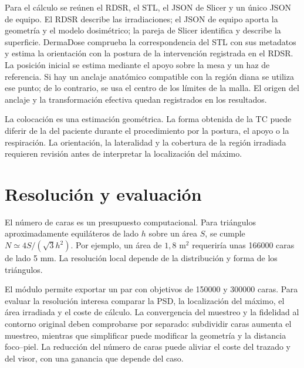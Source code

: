 Para el cálculo se reúnen el RDSR, el STL, el JSON de Slicer y un único JSON de equipo. El RDSR describe las irradiaciones; el JSON de equipo aporta la geometría y el modelo dosimétrico; la pareja de Slicer identifica y describe la superficie. DermaDose comprueba la correspondencia del STL con sus metadatos y estima la orientación con la postura de la intervención registrada en el RDSR. La posición inicial se estima mediante el apoyo sobre la mesa y un haz de referencia. Si hay un anclaje anatómico compatible con la región diana se utiliza ese punto; de lo contrario, se usa el centro de los límites de la malla. El origen del anclaje y la transformación efectiva quedan registrados en los resultados.

La colocación es una estimación geométrica. La forma obtenida de la TC puede diferir de la del paciente durante el procedimiento por la postura, el apoyo o la respiración. La orientación, la lateralidad y la cobertura de la región irradiada requieren revisión antes de interpretar la localización del máximo.

\section{Resolución y evaluación}
El número de caras es un presupuesto computacional. Para triángulos aproximadamente equiláteros de lado $h$ sobre un área $S$, se cumple $N\simeq4S/(\sqrt{3}h^2)$. Por ejemplo, un área de $1{,}8$ m$^2$ requeriría unas \num{166000} caras de lado 5 mm. La resolución local depende de la distribución y forma de los triángulos.

El módulo permite exportar un par con objetivos de \num{150000} y \num{300000} caras. Para evaluar la resolución interesa comparar la PSD, la localización del máximo, el área irradiada y el coste de cálculo. La convergencia del muestreo y la fidelidad al contorno original deben comprobarse por separado: subdividir caras aumenta el muestreo, mientras que simplificar puede modificar la geometría y la distancia foco--piel. La reducción del número de caras puede aliviar el coste del trazado y del visor, con una ganancia que depende del caso.

